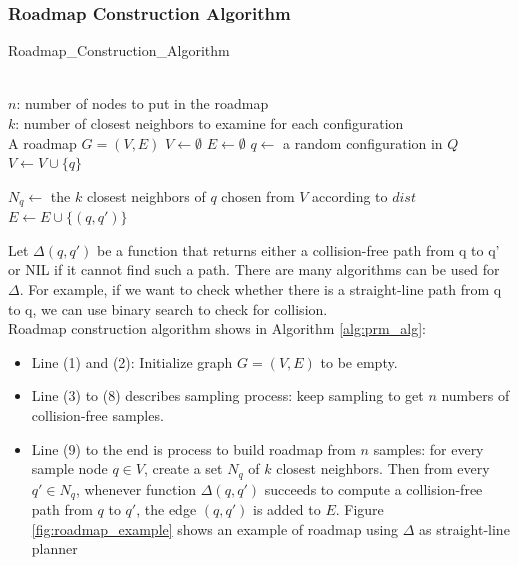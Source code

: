 \documentclass[11pt]{article}
\begin{document}
\subsubsection{Roadmap Construction Algorithm}
\begin{algorithm} 
\caption{Roadmap\_Construction\_Algorithm} 
\label{alg:prm_alg} 
  \begin{algorithmic}[1]
  \REQUIRE~~\\
    $n$: number of nodes to put in the roadmap\\
    $k$: number of closest neighbors to examine for each configuration
  \ENSURE~~\\
    A roadmap $G=(V,E)$
    \STATE $V \leftarrow \emptyset$ 
    \STATE $E \leftarrow \emptyset$
      \REPEAT
    \STATE $q \leftarrow$ a random configuration in $Q$      
      \STATE $V \leftarrow V \cup \{q\}$
    \ENDWHILE
    
    \STATE $N_q \leftarrow$ the $k$ closest neighbors of $q$ chosen from $V$ according to $dist$
        \STATE $E \leftarrow E \cup \{(q,q')\}$
      \ENDIF
    \ENDFOR
  \ENDFOR
    \end{algorithmic}
\end{algorithm}

Let $\Delta(q, q')$ be a function that returns either a collision-free path from q to q' or NIL if it cannot find such a path. There are many algorithms can be used for $\Delta$. For example, if we want to check whether there is a straight-line path from q to q, we can use binary search to check for collision.\\
Roadmap construction algorithm shows in Algorithm \ref{alg:prm_alg}:
\begin{itemize}
\item Line (1) and (2): Initialize graph $G=(V,E)$ to be empty.
\item Line (3) to (8) describes sampling process: keep sampling to get $n$ numbers of collision-free samples.
\item Line (9) to the end is process to build roadmap from $n$ samples: for every sample node $q\in V$, create a set $N_q$ of $k$ closest neighbors. Then from every $q' \in N_q$, whenever function $\Delta(q, q')$ succeeds to compute a collision-free path from $q$ to $q'$, the edge $(q,q')$ is added to $E$. Figure \ref{fig:roadmap_example} shows an example of roadmap using $\Delta$ as straight-line planner
\end{itemize}
\end{document}
